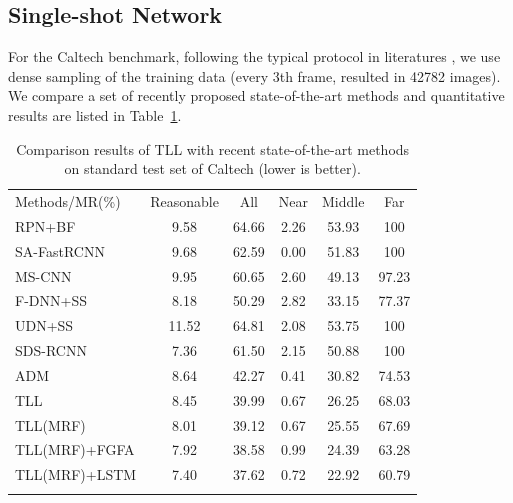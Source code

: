 \documentclass[runningheads]{llncs}
\begin{document}
\subsection{Single-shot Network}
For the Caltech benchmark, following the typical protocol in literatures \cite{FRCNNPD,SAFRCNN,MSCNN}, we use dense sampling of the training data (every 3th frame, resulted in 42782 images). We compare a set of recently proposed state-of-the-art methods and quantitative results are listed in Table~\ref{Cal_res_tab}.
\setlength{\tabcolsep}{4pt}
\begin{table}[t]
	\begin{center}
		\caption{Comparison results of TLL with recent state-of-the-art methods on standard test set of Caltech (lower is better).}
		\label{Cal_res_tab}
		\begin{tabular}{lccccc}
			\hline\noalign{\smallskip}
			Methods/MR(\%) & Reasonable & All & Near & Middle & Far\\
			\noalign{\smallskip}
			\hline
			\noalign{\smallskip}
			RPN+BF \cite{FRCNNPD}  & 9.58 & 64.66 & 2.26 & 53.93 & 100\\
			SA-FastRCNN \cite{SAFRCNN}  & 9.68 & 62.59 & 0.00 & 51.83 & 100\\
			MS-CNN \cite{MSCNN}  & 9.95 & 60.65 & 2.60 & 49.13 & 97.23\\
			F-DNN+SS \cite{FDNN}  & 8.18 & 50.29 & 2.82 & 33.15 & 77.37\\
			UDN+SS \cite{UDN}  & 11.52 & 64.81 & 2.08 & 53.75 & 100\\
			SDS-RCNN \cite{SDSRCNN}  & 7.36 & 61.50 & 2.15 & 50.88 & 100\\
			ADM \cite{ADM}  & 8.64 & 42.27 & 0.41 & 30.82 & 74.53\\
			TLL  & 8.45 & 39.99 & 0.67 & 26.25 & 68.03\\
			TLL(MRF)  & 8.01 & 39.12 & 0.67 & 25.55 & 67.69\\
			\noalign{\smallskip}
			\hline
			\noalign{\smallskip}
			TLL(MRF)+FGFA \cite{FGFA}  & 7.92 & 38.58 & 0.99 & 24.39 & 63.28\\
			TLL(MRF)+LSTM  & 7.40 & 37.62 & 0.72 & 22.92 & 60.79\\	
			\noalign{\smallskip}		
			\hline
		\end{tabular}
	\end{center}
\end{table}
\setlength{\tabcolsep}{1.4pt}
\end{document}
